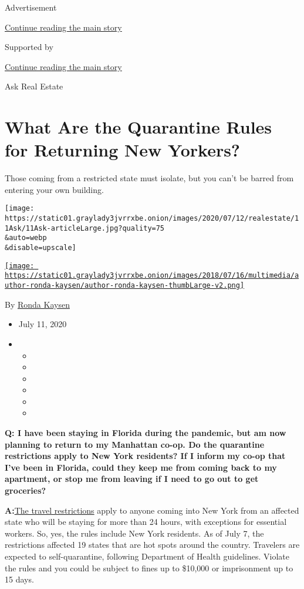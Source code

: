 Advertisement

\protect\hyperlink{after-top}{Continue reading the main story}

Supported by

\protect\hyperlink{after-sponsor}{Continue reading the main story}

Ask Real Estate

\hypertarget{what-are-the-quarantine-rules-for-returning-new-yorkers}{%
\section{What Are the Quarantine Rules for Returning New
Yorkers?}\label{what-are-the-quarantine-rules-for-returning-new-yorkers}}

Those coming from a restricted state must isolate, but you can't be
barred from entering your own building.

\texttt{[image: https://static01.graylady3jvrrxbe.onion/images/2020/07/12/realestate/11Ask/11Ask-articleLarge.jpg?quality=75\\\&auto=webp\\\&disable=upscale]}

\href{https://www.nytimes3xbfgragh.onion/by/ronda-kaysen}{\texttt{[image: https://static01.graylady3jvrrxbe.onion/images/2018/07/16/multimedia/author-ronda-kaysen/author-ronda-kaysen-thumbLarge-v2.png]}}

By \href{https://www.nytimes3xbfgragh.onion/by/ronda-kaysen}{Ronda
Kaysen}

\begin{itemize}
\item
  July 11, 2020
\item
  \begin{itemize}
  \item
  \item
  \item
  \item
  \item
  \item
  \end{itemize}
\end{itemize}

\textbf{Q: I have been staying in Florida during the pandemic, but am
now planning to return to my Manhattan co-op. Do the quarantine
restrictions apply to New York residents? If I inform my co-op that I've
been in Florida, could they keep me from coming back to my apartment, or
stop me from leaving if I need to go out to get groceries?}

\textbf{A:}\href{https://coronavirus.health.ny.gov/covid-19-travel-advisory}{The
travel restrictions} apply to anyone coming into New York from an
affected state who will be staying for more than 24 hours, with
exceptions for essential workers. So, yes, the rules include New York
residents. As of July 7, the restrictions affected 19 states that are
hot spots around the country. Travelers are expected to self-quarantine,
following Department of Health guidelines. Violate the rules and you
could be subject to fines up to \$10,000 or imprisonment up to 15 days.

